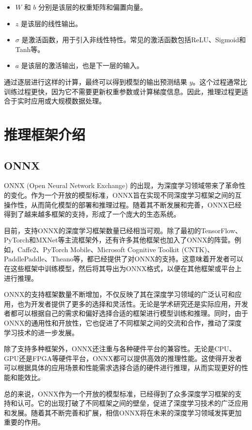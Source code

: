 \begin{itemize}
	\item $W$ 和 $b$ 分别是该层的权重矩阵和偏置向量。
	\item $z$ 是该层的线性输出。
	\item $\sigma$ 是激活函数，用于引入非线性特性。常见的激活函数包括ReLU、Sigmoid和Tanh等。
	\item $a$ 是该层的激活输出，也是下一层的输入。
\end{itemize}

通过逐层进行这样的计算，最终可以得到模型的输出预测结果 $y$。这个过程通常比训练过程更快，因为它不需要更新权重参数或计算梯度信息。因此，推理过程更适合于实时应用或大规模数据处理。

\section{推理框架介绍}

\subsection{ONNX}

ONNX (Open Neural Network Exchange) 的出现，为深度学习领域带来了革命性的变化。作为一个开放的模型标准，ONNX旨在实现不同深度学习框架之间的互操作性，从而简化模型的部署和推理过程。随着其不断发展和完善，ONNX已经得到了越来越多框架的支持，形成了一个庞大的生态系统。

目前，支持ONNX的深度学习框架数量已经相当可观。除了最初的TensorFlow、PyTorch和MXNet等主流框架外，还有许多其他框架也加入了ONNX的阵营。例如，Caffe2、PyTorch Mobile、Microsoft Cognitive Toolkit (CNTK)、PaddlePaddle、Theano等，都已经提供了对ONNX的支持。这意味着开发者可以在这些框架中训练模型，然后将其导出为ONNX格式，以便在其他框架或平台上进行推理。

ONNX的支持框架数量不断增加，不仅反映了其在深度学习领域的广泛认可和应用，也为开发者提供了更多的选择和灵活性。无论是学术研究还是实际应用，开发者都可以根据自己的需求和偏好选择合适的框架进行模型训练和推理。同时，由于ONNX的通用性和开放性，它也促进了不同框架之间的交流和合作，推动了深度学习技术的进一步发展。

除了支持多种框架外，ONNX还注重与各种硬件平台的兼容性。无论是CPU、GPU还是FPGA等硬件平台，ONNX都可以提供高效的推理性能。这使得开发者可以根据具体的应用场景和性能需求选择合适的硬件进行推理，从而实现更好的性能和能效比。

总的来说，ONNX作为一个开放的模型标准，已经得到了众多深度学习框架的支持和认可。它的出现打破了不同框架之间的壁垒，促进了深度学习技术的广泛应用和发展。随着其不断完善和扩展，相信ONNX将在未来的深度学习领域发挥更加重要的作用。

